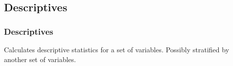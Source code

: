 \documentclass[xcolor={table},c]{beamer}
\begin{document}
\subsection{Descriptives}
\begin{frame}\frametitle{Descriptives}
Calculates descriptive statistics for a set of variables. Possibly stratified by another set of variables. 
\begin{columns}
\begin{column}{0.5\textwidth}
\end{column}
\begin{column}{0.5\textwidth}
\end{column}
\end{columns}
\end{frame}
\end{document}
